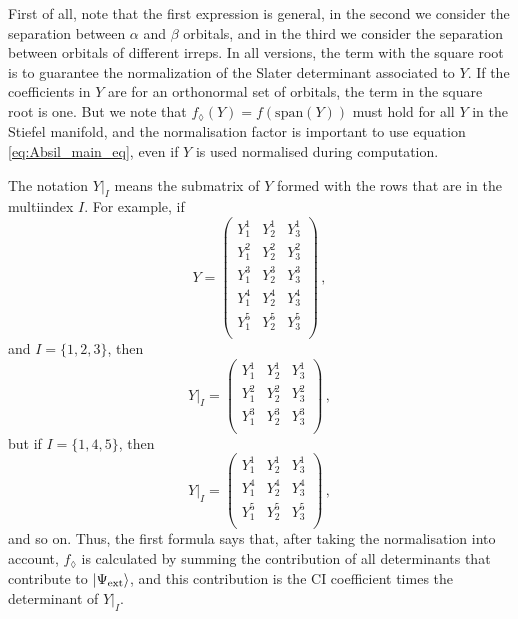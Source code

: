 First of all, note that the first expression is general, in the second we consider the separation between $\alpha$ and $\beta$ orbitals, and in the third we consider the separation between orbitals of different irreps.
In all versions, the term with the square root is to guarantee the normalization of the Slater determinant associated to $Y$.
If the coefficients in $Y$ are for an orthonormal set of orbitals, the term in the square root is one.
But we note that $f_\lozenge(Y) = f(\text{span}(Y))$ must hold for all $Y$ in the Stiefel manifold, and the normalisation factor is important to use equation \eqref{eq:Absil_main_eq}, even if $Y$ is used normalised during computation.

The notation $Y\big|_I$ means the submatrix of $Y$ formed with the rows that are in the multiindex $I$.
For example, if
\begin{equation}
  Y =
  \begin{pmatrix}
    Y^1_1 & Y^1_2 & Y^1_3\\
    Y^2_1 & Y^2_2 & Y^2_3\\
    Y^3_1 & Y^3_2 & Y^3_3\\
    Y^4_1 & Y^4_2 & Y^4_3\\
    Y^5_1 & Y^5_2 & Y^5_3\\
  \end{pmatrix}\,,
\end{equation}
and $I=\{1, 2, 3\}$, then
\begin{equation}
  Y\big|_I =
  \begin{pmatrix}
    Y^1_1 & Y^1_2 & Y^1_3\\
    Y^2_1 & Y^2_2 & Y^2_3\\
    Y^3_1 & Y^3_2 & Y^3_3\\
  \end{pmatrix}\,,
\end{equation}
but if $I=\{1, 4, 5\}$, then
\begin{equation}
  Y\big|_I =
  \begin{pmatrix}
    Y^1_1 & Y^1_2 & Y^1_3\\
    Y^4_1 & Y^4_2 & Y^4_3\\
    Y^5_1 & Y^5_2 & Y^5_3\\
  \end{pmatrix}\,,
\end{equation}
and so on.
Thus, the first formula says that, after taking the normalisation into account, $f_\lozenge$ is calculated by summing the contribution of all determinants that contribute to $\ket{\Psi_\text{ext}}$, and this contribution is the CI coefficient times the determinant of $Y\big|_I$.

